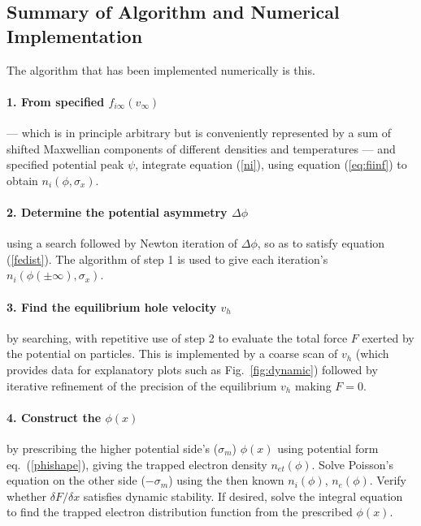 \documentclass[12pt]{article}
\begin{document}
\subsection{Summary of Algorithm and Numerical Implementation}

The algorithm that has been implemented numerically is this.

\paragraph{1. From specified $f_{i\infty}(v_\infty)$} --- which is in
principle arbitrary but is conveniently represented by a sum of
shifted Maxwellian components of different densities and temperatures
--- and specified potential peak $\psi$, integrate equation
(\ref{ni}), using equation (\ref{eq:fiinf}) to obtain
$n_i(\phi,\sigma_x)$.

\paragraph{2. Determine the potential asymmetry $\Delta \phi$} using a
search followed by Newton iteration of $\Delta\phi$, so as to satisfy
equation (\ref{fedist}). The algorithm of step 1 is used to give each
iteration's $n_i(\phi(\pm\infty),\sigma_x)$.

\paragraph{3. Find the equilibrium hole velocity $v_h$} by searching,
with repetitive use of step 2 to evaluate the total force $F$ exerted
by the potential on particles. This is implemented by a coarse scan of
$v_h$ (which provides data for explanatory plots such as Fig.\
\ref{fig:dynamic}) followed by iterative refinement of the precision
of the equilibrium $v_h$ making $F=0$.

\paragraph{4. Construct the $\phi(x)$} by prescribing the higher
potential side's ($\sigma_m$) $\phi(x)$ using potential form eq.\
(\ref{phishape}), giving the trapped electron density
$n_{et}(\phi)$. Solve Poisson's equation on the other side
($-\sigma_m$) using the then known $n_i(\phi)$, $n_e(\phi)$. Verify
whether $\delta F/\delta x$ satisfies dynamic stability.  If desired,
solve the integral equation to find the trapped electron distribution
function from the prescribed $\phi(x)$.
\end{document}
